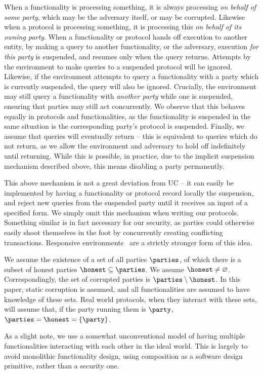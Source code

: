 When a functionality is processing something, it is always processing \emph{on
  behalf of some party}, which may be the adversary itself, or may be corrupted.
Likewise when a protocol is processing something, it is processing this \emph{on
  behalf of its owning party}. When a functionality or protocol hands off
execution to another entity, by making a query to another functionality, or the
adversary, execution \emph{for this party} is suspended, and resumes only when
the query returns. Attempts by the environment to make queries to a suspended
protocol will be ignored. Likewise, if the environment attempts to query a
functionality with a party which is currently suspended, the query will also be
ignored. Crucially, the environment may still query a functionality with
\emph{another party} while one is suspended, ensuring that parties may still act
concurrently. We observe that this behaves equally in protocols and
functionalities, as the functionality is suspended in the same situation is the
corresponding party's protocol is suspended. Finally, we assume that queries
will eventually return -- this is equivalent to queries which do not return, as
we allow the environment and adversary to hold off indefinitely until returning.
While this is possible, in practice, due to the implicit suspension mechanism
described above, this means disabling a party permanently.

This above mechanism is not a great deviation from UC -- it can easily be
implemented by having a functionality or protocol record locally the suspension,
and reject new queries from the suspended party until it receives an input of a
specified form. We simply omit this mechanism when writing our protocols.
Something similar is in fact necessary for our security, as parties could
otherwise easily shoot themselves in the foot by concurrently creating
conflicting transactions. Responsive environments~\cite{AC:CEKKR16} are a
strictly stronger form of this idea.

We assume the existence of a set of all parties $\parties$, of which there is a
subset of honest parties $\honest \subseteq \parties$. We assume $\honest \neq
\varnothing$. Correspondingly, the set of corrupted parties is $\parties
\setminus \honest$. In this paper, static corruption is assumed, and all
functionalities are assumed to have knowledge of these sets. Real world
protocols, when they interact with these sets, will assume that, if the party
running them is $\party$, $\parties = \honest = \{\party\}$.

As a slight note, we use a somewhat unconventional model of having multiple
functionalities interacting with each other in the ideal world. This is largely
to avoid monolithic functionality design, using composition as a software design
primitive, rather than a security one.

